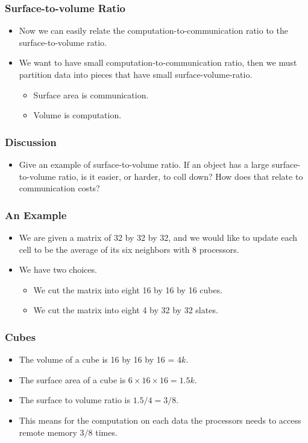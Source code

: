 \documentclass{beamer}
\begin{document}
\begin{CJK}{UTF8}{bsmi}
\begin{frame}
\frametitle{Surface-to-volume Ratio}
\begin{itemize}
\item Now we can easily relate the computation-to-communication ratio
  to the surface-to-volume ratio.
\item We want to have small computation-to-communication ratio, then
  we must partition data into pieces that have small
  surface-volume-ratio.
\begin{itemize}
\item Surface area is communication.
\item Volume is computation.
\end{itemize}
\end{itemize}
\end{frame}

\begin{frame}
\frametitle{Discussion}
\begin{itemize}
\item Give an example of surface-to-volume ratio.  If an object has a
  large surface-to-volume ratio, is it easier, or harder, to coll
  down?  How does that relate to communication costs?
\end{itemize}
\end{frame}

\begin{frame}
\frametitle{An Example}
\begin{itemize}
\item We are given a matrix of 32 by 32 by 32, and we would like to
  update each cell to be the average of its six neighbors with 8
  processors.
\item We have two choices.
\begin{itemize}
\item We cut the matrix into eight 16 by 16 by 16 cubes.
\item We cut the matrix into eight 4 by 32 by 32 slates.
\end{itemize}
\end{itemize}
\end{frame}

\begin{frame}
\frametitle{Cubes}
\begin{itemize}
\item The volume of a cube is 16 by 16 by 16 = $4k$.
\item The surface area of a cube is $6 \times 16 \times 16 = 1.5k$.
\item The surface to volume ratio is $1.5/4 = 3/8$.
\item This means for the computation on each data the processors needs
  to access remote memory $3/8$ times.
\end{itemize}
\end{frame}


\end{CJK}
\end{document}

